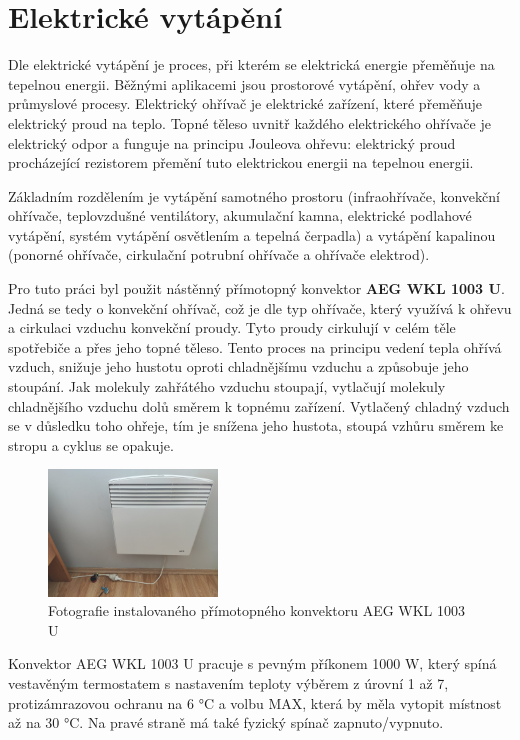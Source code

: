 \section{Elektrické vytápění}
Dle \cite{electricHeating} elektrické vytápění je proces, při kterém se elektrická energie přeměňuje na tepelnou energii. Běžnými aplikacemi jsou prostorové vytápění, ohřev vody a průmyslové procesy. Elektrický ohřívač je elektrické zařízení, které přeměňuje elektrický proud na teplo. Topné těleso uvnitř každého elektrického ohřívače je elektrický odpor a funguje na principu Jouleova ohřevu: elektrický proud procházející rezistorem přemění tuto elektrickou energii na tepelnou energii.

Základním rozdělením je vytápění samotného prostoru (infraohřívače, konvekční ohřívače, teplovzdušné ventilátory, akumulační kamna, elektrické podlahové vytápění, systém vytápění osvětlením a tepelná čerpadla) a vytápění kapalinou (ponorné ohřívače, cirkulační potrubní ohřívače a ohřívače elektrod).

Pro tuto práci byl použit nástěnný přímotopný konvektor \textbf{AEG WKL 1003 U}. Jedná se tedy o konvekční ohřívač, což je dle \cite{convectionHeater} typ ohřívače, který využívá k ohřevu a cirkulaci vzduchu konvekční proudy. Tyto proudy cirkulují v celém těle spotřebiče a přes jeho topné těleso. Tento proces na principu vedení tepla ohřívá vzduch, snižuje jeho hustotu oproti chladnějšímu vzduchu a způsobuje jeho stoupání. Jak molekuly zahřátého vzduchu stoupají, vytlačují molekuly chladnějšího vzduchu dolů směrem k topnému zařízení. Vytlačený chladný vzduch se v důsledku toho ohřeje, tím je snížena jeho hustota, stoupá vzhůru směrem ke stropu a cyklus se opakuje.

\begin{figure}[hbt]
\centering
\includegraphics[width=0.4\textwidth]{obrazky-figures/aeg-wkl-1003u.png}
\caption{Fotografie instalovaného přímotopného konvektoru AEG WKL 1003 U}
\end{figure}


Konvektor AEG WKL 1003 U pracuje s pevným příkonem 1000 W, který spíná vestavěným termostatem s nastavením teploty výběrem z úrovní 1 až 7, protizámrazovou ochranu na 6 °C a volbu MAX, která by měla vytopit místnost až na 30 °C. Na pravé straně má také fyzický spínač zapnuto/vypnuto.


